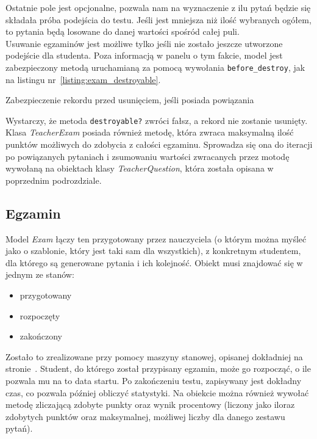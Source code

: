 \documentclass[12pt,twoside]{report}
\begin{document}
Ostatnie pole jest opcjonalne, pozwala nam na wyznaczenie z ilu pytań będzie się składała
próba podejścia do testu. Jeśli jest mniejsza niż ilość wybranych ogółem, to pytania będą
losowane do danej wartości spośród całej puli.\\
Usuwanie egzaminów jest możliwe tylko jeśli nie zostało jeszcze utworzone podejście dla
studenta. Poza informacją w panelu o tym fakcie, model jest zabezpieczony metodą
uruchamianą za pomocą wywołania \texttt{before\_destroy}, jak na listingu
nr~\ref{listing:exam_destroyable}.

\begin{listing}
  
  \caption{Zabezpieczenie rekordu przed usunięciem, jeśli posiada powiązania}
  \label{listing:exam_destroyable}
\end{listing}


Wystarczy, że metoda \texttt{destroyable?} zwróci fałsz, a rekord nie zostanie usunięty.
Klasa \emph{TeacherExam} posiada również metodę, która zwraca maksymalną ilość punktów
możliwych do zdobycia z całości egzaminu. Sprowadza się ona do iteracji po powiązanych
pytaniach i zsumowaniu wartości zwracanych przez motodę wywołaną na obiektach
klasy \emph{TeacherQuestion}, która została opisana w poprzednim podrozdziale.

\subsection{Egzamin}
Model \emph{Exam} łączy ten przygotowany przez nauczyciela (o którym można myśleć jako
o szablonie, który jest taki sam dla wszystkich), z konkretnym studentem, dla którego są
generowane pytania i ich kolejność. Obiekt musi znajdować się w jednym ze stanów:

\begin{itemize}
  \item{przygotowany}
  \item{rozpoczęty}
  \item{zakończony}
\end{itemize}


Zostało to zrealizowane przy pomocy maszyny stanowej, opisanej dokładniej na
stronie~\pageref{sec:state_machine}. Student, do którego został przypisany egzamin, może
go rozpocząć, o ile pozwala mu na to data startu. Po zakończeniu testu, zapisywany jest
dokładny czas, co pozwala później obliczyć statystyki. Na obiekcie można również wywołać
metodę zliczającą zdobyte punkty oraz wynik procentowy (liczony jako iloraz zdobytych
punktów oraz maksymalnej, możliwej liczby dla danego zestawu pytań).
\end{document}
